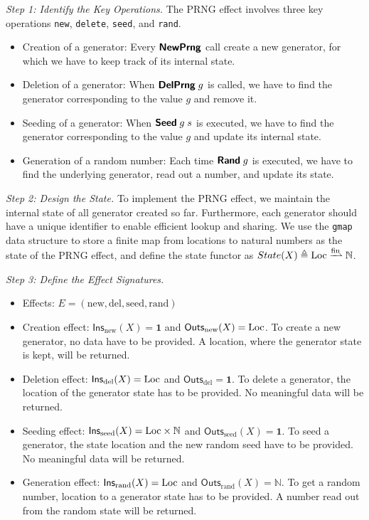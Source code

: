 \documentclass{article}
\theoremstyle{definition}
\theoremstyle{plain}
\theoremstyle{remark}
\newcommand{\Ins}{\mathsf{Ins}}
\newcommand{\Outs}{\mathsf{Outs}}
\newcommand{\new}{\mathrm{new}}
\newcommand{\del}{\mathrm{del}}
\newcommand{\seed}{\mathrm{seed}}
\newcommand{\rand}{\mathrm{rand}}
\begin{document}
\emph{Step 1: Identify the Key Operations.} The PRNG effect involves three key operations \texttt{new}, \texttt{delete}, \texttt{seed}, and \texttt{rand}.

\begin{itemize}
  \item Creation of a generator: Every \(\bm{{ {\mathsf{NewPrng}}}}\) call create a new generator, for which we have to keep track of its internal state.
  \item Deletion of a generator: When \(\bm{{ {\mathsf{DelPrng}}}}\; g\) is called, we have to find the generator corresponding to the value \(g\) and remove it.
  \item Seeding of a generator: When \(\bm{{ {\mathsf{Seed}}}}\; g\; s\) is executed, we have to find the generator corresponding to the value \(g\) and update its internal state.
  \item Generation of a random number: Each time \(\bm{{ {\mathsf{Rand}}}}\; g\) is executed, we have to find the underlying generator, read out a number, and update its state.
\end{itemize}

\emph{Step 2: Design the State.} To implement the PRNG effect, we maintain the internal state of all generator created so far. Furthermore, each generator should have a unique identifier to enable efficient lookup and sharing. We use the \texttt{gmap} data structure to store a finite map from locations to natural numbers as the state of the PRNG effect, and define the state functor as \(State(X) \eqdef \iLoc \fpfn \mathbb{N}\).

\emph{Step 3: Define the Effect Signatures.}

\begin{itemize}
  \item Effects: \(E = (\new, \del, \seed, \rand)\)
  \item Creation effect: \(\Ins_{\new}(X) = \mathbf{1}\) and \(\Outs_{\new}(X) = \iLoc\).
    To create a new generator, no data have to be provided. A location, where the generator state is kept, will be returned.
  \item Deletion effect: \(\Ins_{\del}(X) = \iLoc\) and \(\Outs_{\del} = \mathbf{1}\).
    To delete a generator, the location of the generator state has to be provided. No meaningful data will be returned.
  \item Seeding effect: \(\Ins_{\seed}(X) = \iLoc \times \mathbb{N}\) and \(\Outs_{\seed}(X) = \mathbf{1}\).
    To seed a generator, the state location and the new random seed have to be provided. No meaningful data will be returned.
  \item Generation effect: \(\Ins_{\rand}(X) = \iLoc\) and \(\Outs_{\rand}(X) = \mathbb{N}\).
    To get a random number, location to a generator state has to be provided. A number read out from the random state will be returned.
\end{itemize}
\end{document}

